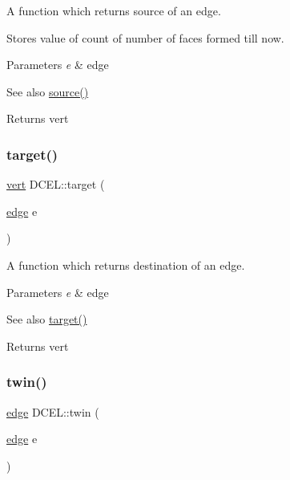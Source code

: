 A function which returns source of an edge. 

Stores value of count of number of faces formed till now.


\begin{DoxyParams}{Parameters}
{\em e} & edge \\
\hline
\end{DoxyParams}
\begin{DoxySeeAlso}{See also}
\hyperlink{class_d_c_e_l_aefc1eac40e592c8616801c02b5f45545}{source()} 
\end{DoxySeeAlso}
\begin{DoxyReturn}{Returns}
vert 
\end{DoxyReturn}
\mbox{\label{class_d_c_e_l_ad0eee4ae2f3c3676fc808e4359a0a874}} 
\subsubsection{\texorpdfstring{target()}{target()}}
{\footnotesize\ttfamily \hyperlink{_polygon_triangulation_8h_a15bccd83c1e570e4a0ff17c42152989b}{vert} D\+C\+E\+L\+::target (\begin{DoxyParamCaption}\item[{\hyperlink{_polygon_triangulation_8h_a4ef43ff5c6d42dacbc8ffd9c8cfdc189}{edge}}]{e }\end{DoxyParamCaption})\hspace{0.3cm}{\ttfamily [inline]}}



A function which returns destination of an edge. 


\begin{DoxyParams}{Parameters}
{\em e} & edge \\
\hline
\end{DoxyParams}
\begin{DoxySeeAlso}{See also}
\hyperlink{class_d_c_e_l_ad0eee4ae2f3c3676fc808e4359a0a874}{target()} 
\end{DoxySeeAlso}
\begin{DoxyReturn}{Returns}
vert 
\end{DoxyReturn}
\mbox{\label{class_d_c_e_l_a6829b94835f0c953a1f0c557131feef9}} 
\subsubsection{\texorpdfstring{twin()}{twin()}}
{\footnotesize\ttfamily \hyperlink{_polygon_triangulation_8h_a4ef43ff5c6d42dacbc8ffd9c8cfdc189}{edge} D\+C\+E\+L\+::twin (\begin{DoxyParamCaption}\item[{\hyperlink{_polygon_triangulation_8h_a4ef43ff5c6d42dacbc8ffd9c8cfdc189}{edge}}]{e }\end{DoxyParamCaption})\hspace{0.3cm}{\ttfamily [inline]}}



